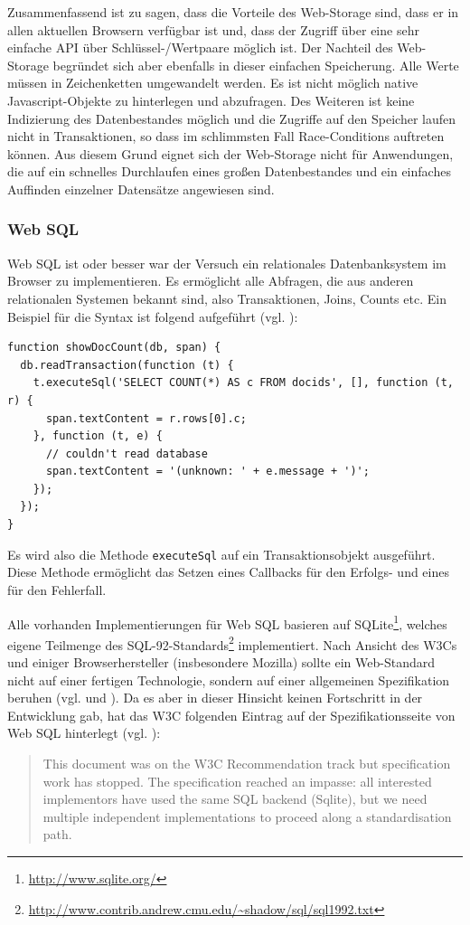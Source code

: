 Zusammenfassend ist zu sagen, dass die Vorteile des Web-Storage sind, dass er in allen aktuellen Browsern verfügbar ist und, dass der Zugriff über eine sehr einfache API über Schlüssel-/Wertpaare möglich ist. Der Nachteil des Web-Storage begründet sich aber ebenfalls in dieser einfachen Speicherung. Alle Werte müssen in Zeichenketten umgewandelt werden. Es ist nicht möglich native Javascript-Objekte zu hinterlegen und abzufragen. Des Weiteren ist keine Indizierung des Datenbestandes möglich und die Zugriffe auf den Speicher laufen nicht in Transaktionen, so dass im schlimmsten Fall Race-Conditions auftreten können. Aus diesem Grund eignet sich der Web-Storage nicht für Anwendungen, die auf ein schnelles Durchlaufen eines großen Datenbestandes und ein einfaches Auffinden einzelner Datensätze angewiesen sind.

\subsubsection*{Web SQL}
Web SQL ist oder besser war der Versuch ein relationales Datenbanksystem im Browser zu implementieren. Es ermöglicht alle Abfragen, die aus anderen relationalen Systemen bekannt sind, also Transaktionen, Joins, Counts etc. Ein Beispiel für die Syntax ist folgend aufgeführt (vgl. \cite{W3C2010}):
\begin{lstlisting}
function showDocCount(db, span) {
  db.readTransaction(function (t) {
    t.executeSql('SELECT COUNT(*) AS c FROM docids', [], function (t, r) {
      span.textContent = r.rows[0].c;
    }, function (t, e) {
      // couldn't read database
      span.textContent = '(unknown: ' + e.message + ')';
    });
  });
}
\end{lstlisting}
Es wird also die Methode \texttt{executeSql} auf ein Transaktionsobjekt ausgeführt. Diese Methode ermöglicht das Setzen eines Callbacks für den Erfolgs- und eines für den Fehlerfall. 

Alle vorhanden Implementierungen für Web SQL basieren auf SQLite\footnote{\url{http://www.sqlite.org/}}, welches eigene Teilmenge des SQL-92-Standards\footnote{\url{http://www.contrib.andrew.cmu.edu/~shadow/sql/sql1992.txt}} implementiert. Nach Ansicht des W3Cs und einiger Browserhersteller (insbesondere Mozilla) sollte ein Web-Standard nicht auf einer fertigen Technologie, sondern auf einer allgemeinen Spezifikation beruhen (vgl. \cite{W3C2010} und \cite{Ranganathan2010}). Da es aber in dieser Hinsicht keinen Fortschritt in der Entwicklung gab, hat das W3C folgenden Eintrag auf der Spezifikationsseite von Web SQL hinterlegt (vgl. \cite{W3C2010}):
\begin{quotation}
 This document was on the W3C Recommendation track but specification work has stopped. The specification reached an impasse: all interested implementors have used the same SQL backend (Sqlite), but we need multiple independent implementations to proceed along a standardisation path.
\end{quotation} 

